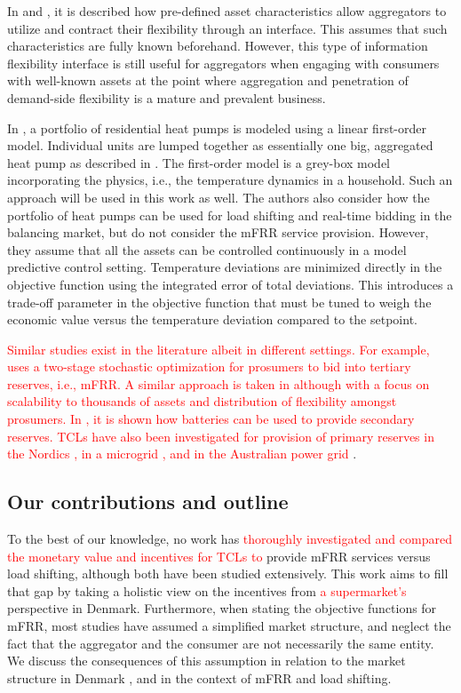 \documentclass[11pt,a4paper]{article}
\begin{document}
In \cite{biegel2013information} and \cite{BiegelConstractingFlexServices}, it is described how pre-defined asset characteristics allow aggregators to utilize and contract their flexibility through an interface. This assumes that such characteristics are fully known beforehand. However, this type of information flexibility interface is still useful for aggregators when engaging with consumers with well-known assets at the point where aggregation and penetration of demand-side flexibility is a mature and prevalent business.

In \cite{biegel2013electricity}, a portfolio of residential heat pumps is modeled using a linear first-order model. Individual units are lumped together as essentially one big, aggregated heat pump as described in \cite{biegel2013lumped}. The first-order model is a grey-box model incorporating the physics, i.e., the temperature dynamics in a household. Such an approach will be used in this work as well. The authors also consider how the portfolio of heat pumps can be used for load shifting and real-time bidding in the balancing market, but do not consider the mFRR service provision. However, they assume that all the assets can be controlled continuously in a  model predictive control  setting. Temperature deviations are minimized directly in the objective function using the integrated error of total deviations. This introduces a trade-off parameter in the objective function that must be tuned to weigh the economic value versus the temperature deviation compared to the setpoint.

\textcolor{red}{Similar studies exist in the literature albeit in different settings. For example, \cite{iria2018trading} uses a two-stage stochastic optimization for prosumers to bid into tertiary reserves, i.e., mFRR. A similar approach is taken in \cite{la2021mixed} although with a focus on scalability to thousands of assets and distribution of flexibility amongst prosumers. In \cite{nitsch2021economic}, it is shown how batteries can be used to provide secondary reserves. TCLs have also been investigated for provision of primary reserves in the Nordics \cite{paridari2020flexibility}, in a microgrid \cite{mendieta2020primary}, and in the Australian power grid \cite{attarha2020network}}.

\subsection{Our contributions and outline}
%
To the best of our knowledge, no work has \textcolor{red}{thoroughly investigated and compared the monetary value and incentives for TCLs to} provide mFRR services versus load shifting, although both have been studied extensively. This work aims to fill that gap by taking a holistic view on the incentives from \textcolor{red}{a supermarket's} perspective in Denmark. Furthermore, when stating the objective functions for mFRR, most studies have assumed a simplified market structure, and neglect the fact that the aggregator and the consumer are not necessarily the same entity. We discuss the consequences of this assumption in relation to the market structure in Denmark \cite{gade2022ecosystem}, and in the context of mFRR and load shifting.
\end{document}
